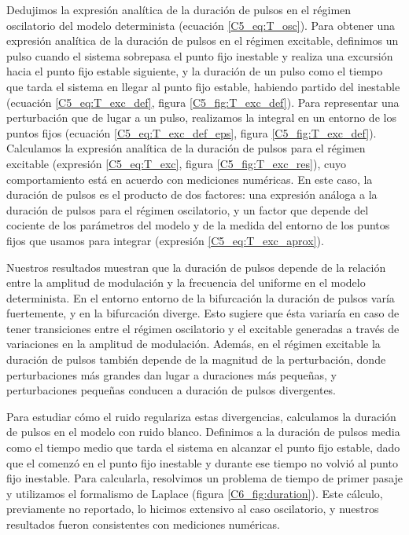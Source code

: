 \documentclass[./main.tex]{subfiles}
\begin{document}
Dedujimos la expresión analítica de la duración de pulsos en el régimen oscilatorio del modelo determinista \cite{Strogatz1994} (ecuación \ref{C5_eq:T_osc}). Para obtener una expresión analítica de la duración de pulsos en el régimen excitable, definimos un pulso cuando el sistema sobrepasa el punto fijo inestable y realiza una excursión hacia el punto fijo estable siguiente, y la duración de un pulso como el tiempo que tarda el sistema en llegar al punto fijo estable, habiendo partido del inestable (ecuación \ref{C5_eq:T_exc_def}, figura \ref{C5_fig:T_exc_def}). Para representar una perturbación que de lugar a un pulso, realizamos la integral en un entorno de los puntos fijos (ecuación \ref{C5_eq:T_exc_def_eps}, figura \ref{C5_fig:T_exc_def}). Calculamos la expresión analítica de la duración de pulsos para el régimen excitable (expresión \ref{C5_eq:T_exc}, figura \ref{C5_fig:T_exc_res}), cuyo comportamiento está en acuerdo con mediciones numéricas. En este caso, la duración de pulsos es el producto de dos factores: una expresión análoga a la duración de pulsos para el régimen oscilatorio, y un factor que depende del cociente de los parámetros del modelo y de la medida del entorno de los puntos fijos que usamos para integrar (expresión \ref{C5_eq:T_exc_aprox}).


Nuestros resultados muestran que la duración de pulsos depende de la relación entre la amplitud de modulación y la frecuencia del uniforme en el modelo determinista. En el entorno entorno de la bifurcación la duración de pulsos varía fuertemente, y en la bifurcación diverge. Esto sugiere que ésta variaría en caso de tener transiciones entre el régimen oscilatorio y el excitable generadas a través de variaciones en la amplitud de modulación. Además, en el régimen excitable la duración de pulsos también depende de la magnitud de la perturbación, donde perturbaciones más grandes dan lugar a duraciones más pequeñas, y 
perturbaciones pequeñas conducen a duración de pulsos divergentes. 

Para estudiar cómo el ruido regulariza estas divergencias, calculamos la duración de pulsos en el modelo con ruido blanco. Definimos a la duración de pulsos media como el tiempo medio que tarda el sistema en alcanzar el punto fijo estable, dado que el comenzó en el punto fijo inestable y durante ese tiempo no volvió al punto fijo inestable. Para calcularla, resolvimos un problema de tiempo de primer pasaje y utilizamos el formalismo de Laplace (figura \ref{C6_fig:duration}). Este cálculo, previamente no reportado, lo hicimos extensivo al caso oscilatorio, y nuestros resultados fueron consistentes con mediciones numéricas. 
\end{document}
